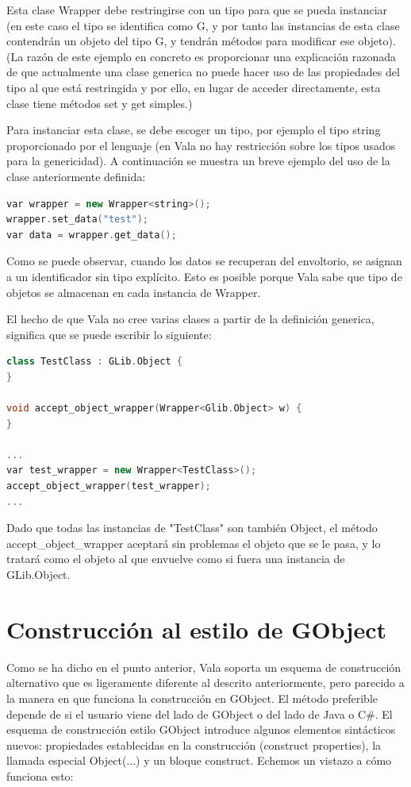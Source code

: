 \documentclass[12pt,twoside]{book}
\begin{document}
Esta clase Wrapper debe restringirse con un tipo para que se pueda instanciar (en este caso el tipo se identifica como G, y por tanto las instancias de esta clase contendrán un objeto del tipo G, y tendrán métodos para modificar ese objeto). (La razón de este ejemplo en concreto es proporcionar una explicación razonada de que actualmente una clase generica no puede hacer uso de las propiedades del tipo al que está restringida y por ello, en lugar de acceder directamente, esta clase tiene métodos set y get simples.)

Para instanciar esta clase, se debe escoger un tipo, por ejemplo el tipo string proporcionado por el lenguaje (en Vala no hay restricción sobre los tipos usados para la genericidad). A continuación se muestra un breve ejemplo del uso de la clase anteriormente definida:

\begin{lstlisting}[language=C++]
var wrapper = new Wrapper<string>();
wrapper.set_data("test");
var data = wrapper.get_data();
\end{lstlisting}

Como se puede observar, cuando los datos se recuperan del envoltorio, se asignan a un identificador sin tipo explícito. Esto es posible porque Vala sabe que tipo de objetos se almacenan en cada instancia de Wrapper.

El hecho de que Vala no cree varias clases a partir de la definición generica, significa que se puede escribir lo siguiente:

\begin{lstlisting}[language=C++]
class TestClass : GLib.Object {
}

void accept_object_wrapper(Wrapper<Glib.Object> w) {
}

...
var test_wrapper = new Wrapper<TestClass>();
accept_object_wrapper(test_wrapper);
...
\end{lstlisting}

Dado que todas las instancias de "TestClass" son también Object, el método accept\_object\_wrapper aceptará sin problemas el objeto que se le pasa, y lo tratará como el objeto al que envuelve como si fuera una instancia de GLib.Object.


\section{Construcción al estilo de GObject}

Como se ha dicho en el punto anterior, Vala soporta un esquema de construcción alternativo que es ligeramente diferente al descrito anteriormente, pero parecido a la manera en que funciona la construcción en GObject. El método preferible depende de si el usuario viene del lado de GObject o del lado de Java o C\#. El esquema de construcción estilo GObject introduce algunos elementos sintácticos nuevos: propiedades establecidas en la construcción (construct properties), la llamada especial Object(...) y un bloque construct. Echemos un vistazo a cómo funciona esto:
\end{document}
